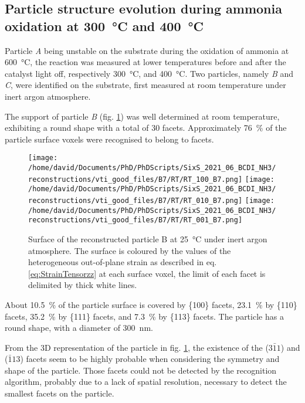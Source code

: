 \subsection{Particle structure evolution during ammonia oxidation at \qty{300}{\degreeCelsius} and \qty{400}{\degreeCelsius}}\label{sec:BCDIAmmoniaOxidation}

Particle \textit{A} being unstable on the substrate during the oxidation of ammonia at \qty{600}{\degreeCelsius}, the reaction was measured at lower temperatures before and after the catalyst light off, respectively \qty{300}{\degreeCelsius}, and \qty{400}{\degreeCelsius}.
Two particles, namely \textit{B} and \textit{C}, were identified on the substrate, first measured at room temperature under inert argon atmosphere.

The support of particle \textit{B} (fig. \ref{fig:B7Facets}) was well determined at room temperature, exhibiting a round shape with a total of 30 facets.
Approximately \qty{76}{\percent} of the particle surface voxels were recognised to belong to facets.

\begin{figure}[!htb]
    \centering
    \texttt{[image: /home/david/Documents/PhD/PhDScripts/SixS\_2021\_06\_BCDI\_NH3/reconstructions/vti\_good\_files/B7/RT/RT\_100\_B7.png]}
    \texttt{[image: /home/david/Documents/PhD/PhDScripts/SixS\_2021\_06\_BCDI\_NH3/reconstructions/vti\_good\_files/B7/RT/RT\_010\_B7.png]}
    \texttt{[image: /home/david/Documents/PhD/PhDScripts/SixS\_2021\_06\_BCDI\_NH3/reconstructions/vti\_good\_files/B7/RT/RT\_001\_B7.png]}
    \caption{
        Surface of the reconstructed particle B at \qty{25}{\degreeCelsius} under inert argon atmosphere.
        The surface is coloured by the values of the heterogeneous out-of-plane strain as described in eq. \ref{eq:StrainTensorzz} at each surface voxel, the limit of each facet is delimited by thick white lines.
    }
    \label{fig:B7Facets}
\end{figure}

About \qty{10.5}{\percent} of the particle surface is covered by \{100\} facets, \qty{23.1}{\percent} by \{110\} facets, \qty{35.2}{\percent} by \{111\} facets, and \qty{7.3}{\percent} by \{113\} facets.
The particle has a round shape, with a diameter of \qty{300}{\nm}.

From the 3D representation of the particle in fig. \ref{fig:B7Facets}, the existence of the ($3\bar{1}1$) and ($\bar{1}13$) facets seem to be highly probable when considering the symmetry and shape of the particle.
Those facets could not be detected by the recognition algorithm, probably due to a lack of spatial resolution, necessary to detect the smallest facets on the particle.

